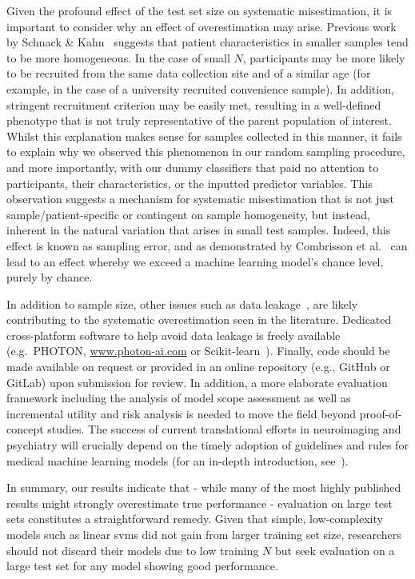 \documentclass[12pt,a4paper]{article}
\begin{document}
    Given the profound effect of the test set size on systematic misestimation, it is important to consider why an effect of overestimation may arise. Previous work by Schnack \& Kahn~\cite{Schnack2016} suggests that patient characteristics in smaller samples tend to be more homogeneous. In the case of small $N$, participants may be more likely to be recruited from the same data collection site and of a similar age (for example, in the case of a university recruited convenience sample). In addition, stringent recruitment criterion may be easily met, resulting in a well-defined phenotype that is not truly representative of the parent population of interest. Whilst this explanation makes sense for samples collected in this manner, it fails to explain why we observed this phenomenon in our random sampling procedure, and more importantly, with our dummy classifiers that paid no attention to participants, their characteristics, or the inputted predictor variables. This observation suggests a mechanism for systematic misestimation that is not just sample/patient-specific or contingent on sample homogeneity, but instead, inherent in the natural variation that arises in small test samples. Indeed, this effect is known as sampling error, and as demonstrated by Combrisson et al.~\cite{Combrisson2015} can lead to an effect whereby we exceed a machine learning model's chance level, purely by chance.

    In addition to sample size, other issues such as data leakage~\cite{Kambeitz2017}, are likely contributing to the systematic overestimation seen in the literature. Dedicated cross-platform software to help avoid data leakage is freely available (e.g.\ PHOTON, \url{www.photon-ai.com} or Scikit-learn~\cite{scikit-learn}). Finally, code should be made available on request or provided in an online repository (e.g., GitHub or GitLab) upon submission for review. In addition, a more elaborate evaluation framework including the analysis of model scope assessment as well as incremental utility and risk analysis is needed to move the field beyond proof-of-concept studies. The success of current translational efforts in neuroimaging and psychiatry will crucially depend on the timely adoption of guidelines and rules for medical machine learning models (for an in-depth introduction, see~\cite{Hahn2019}).

In summary, our results indicate that - while many of the most highly published results might strongly overestimate true performance - evaluation on large test sets constitutes a straightforward remedy. Given that simple, low-complexity models such as linear \acp{svm} did not gain from larger training set size, researchers should not discard their models due to low training $N$ but seek evaluation on a large test set for any model showing good performance.
\end{document}
